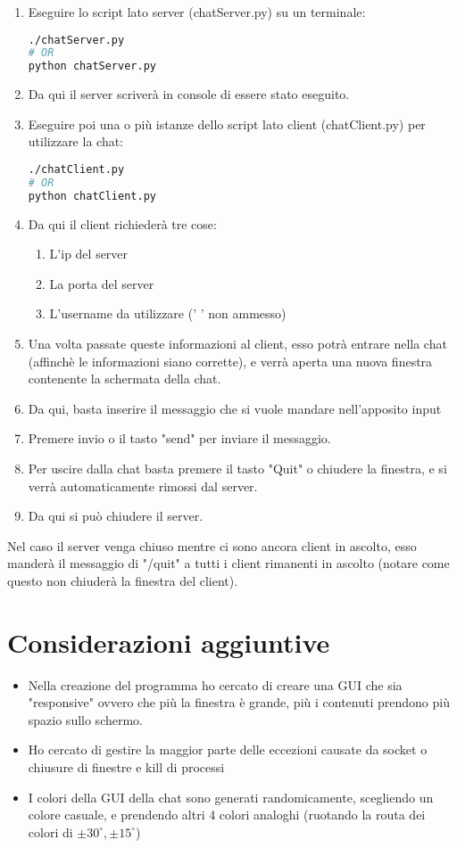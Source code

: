 \documentclass[12pt]{article}
\begin{document}
\begin{enumerate}
    \item Eseguire lo script lato server (chatServer.py) su un terminale:
\begin{lstlisting}[language=Bash, caption=Esecuzione lato server]
./chatServer.py
# OR
python chatServer.py
\end{lstlisting}
    \item Da qui il server scriverà in console di essere stato eseguito.
    \item Eseguire poi una o più istanze dello script lato client (chatClient.py) per utilizzare la chat:
\begin{lstlisting}[language=Bash, caption=Esecuzione lato client]
./chatClient.py
# OR
python chatClient.py
\end{lstlisting}
    \item Da qui il client richiederà tre cose:
    \begin{enumerate}
        \item L'ip del server
        \item La porta del server
        \item L'username da utilizzare (' ' non ammesso)
    \end{enumerate}
    \item Una volta passate queste informazioni al client, esso potrà entrare nella chat (affinchè le informazioni siano corrette), e verrà aperta una nuova finestra contenente la schermata della chat.
    \item Da qui, basta inserire il messaggio che si vuole mandare nell'apposito input
    \item Premere invio o il tasto "send" per inviare il messaggio.
    \item Per uscire dalla chat basta premere il tasto "Quit" o chiudere la finestra, e si verrà automaticamente rimossi dal server.
    \item Da qui si può chiudere il server.
\end{enumerate}
Nel caso il server venga chiuso mentre ci sono ancora client in ascolto, esso manderà il messaggio di "/quit" a tutti i client rimanenti in ascolto (notare come questo non chiuderà la finestra del client).
\section{Considerazioni aggiuntive}
\begin{itemize}
\item Nella creazione del programma ho cercato di creare una GUI che sia "responsive" ovvero che più la finestra è grande, più i contenuti prendono più spazio sullo schermo.
\item Ho cercato di gestire la maggior parte delle eccezioni causate da socket o chiusure di finestre e kill di processi
\item I colori della GUI della chat sono generati randomicamente, scegliendo un colore casuale, e prendendo altri 4 colori analoghi (ruotando la routa dei colori di $\pm 30^\circ, \pm15^\circ$)
\end{itemize}
\end{document}
